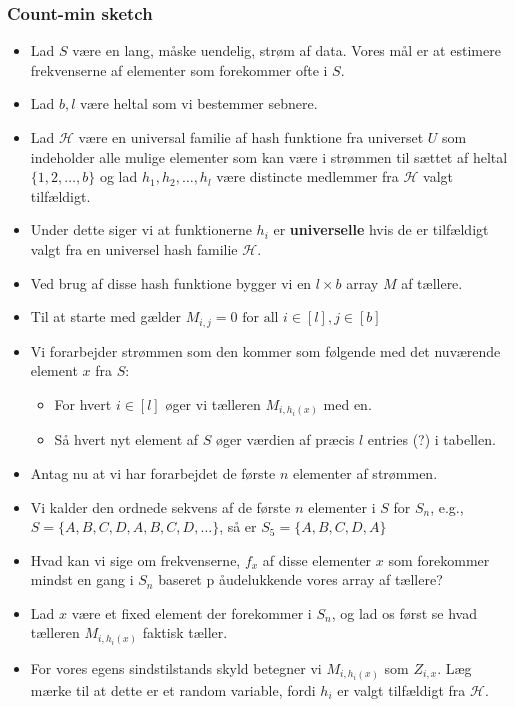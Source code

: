 \documentclass{beamer}
\begin{document}
\begin{frame}[allowframebreaks]
  \frametitle{Count-min sketch}
 \begin{itemize}
 \item Lad $S$ være en lang, måske uendelig, strøm af data. Vores mål er at estimere frekvenserne af elementer som forekommer ofte i $S$.
 \item Lad $b, l$ være heltal som vi bestemmer sebnere.
 \item Lad $\mathcal{H}$ være en universal familie af hash funktione fra universet $U$ som indeholder alle mulige elementer som kan være i strømmen til sættet af heltal $\{1,2, \ldots, b\}$ og lad $h_{1}, h_{2}, \ldots, h_{l}$ være distincte medlemmer fra $\mathcal{H}$ valgt tilfældigt.
 \item Under dette siger vi at funktionerne $h_{i}$ er \textbf{universelle} hvis de er tilfældigt valgt fra en universel hash familie $\mathcal{H}$. 
 \item Ved brug af disse hash funktione bygger vi en $l \times b$ array $M$ af tællere. 
 \item Til at starte med gælder $M_{i,j} = 0 \text{ for all } i \in [l], j \in [b]$
 \item Vi forarbejder strømmen som den kommer som følgende med det nuværende element $x$ fra $S$: 
   \begin{itemize}
   \item For hvert $i \in [l]$ øger vi tælleren $M_{i,h_{i}(x)}$ med en. 
   \item Så hvert nyt element af $S$ øger værdien af præcis $l$ entries (?) i tabellen. 
   \end{itemize}
   \item Antag nu at vi har forarbejdet de første $n$ elementer af strømmen.
   \item Vi kalder den ordnede sekvens af de første $n$ elementer i $S$ for $S_{n}$, e.g., $S = \{A, B, C, D, A, B, C, D, \ldots\}$, så er $S_{5} = \{A,B,C,D,A\}$
   \item Hvad kan vi sige om frekvenserne, $f_{x}$ af disse elementer $x$ som forekommer mindst en gang i $S_{n}$ baseret p åudelukkende vores array af tællere? 
   \item Lad $x$ være et fixed element der forekommer i $S_{n}$, og lad os først se hvad tælleren $M_{i,h_{i}(x)}$ faktisk tæller. 
   \item For vores egens sindstilstands skyld betegner vi $M_{i,h_{i}(x)}$ som $Z_{i,x}$. Læg mærke til at dette er et random variable, fordi $h_{i}$ er valgt tilfældigt fra $\mathcal{H}$. 

\end{itemize}
\end{frame}
\end{document}
